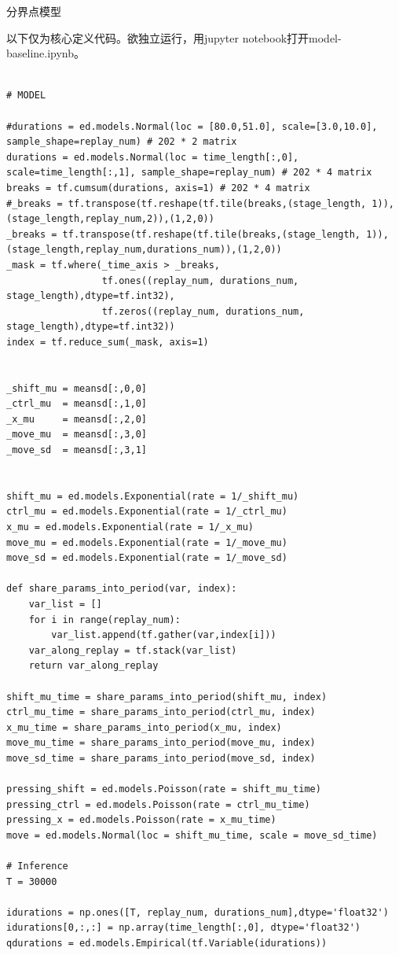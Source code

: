 \documentclass[UTF8]{ctexart}
\begin{document}
分界点模型

以下仅为核心定义代码。欲独立运行，用jupyter notebook打开model-baseline.ipynb。

\begin{verbatim}

# MODEL

#durations = ed.models.Normal(loc = [80.0,51.0], scale=[3.0,10.0], sample_shape=replay_num) # 202 * 2 matrix
durations = ed.models.Normal(loc = time_length[:,0], scale=time_length[:,1], sample_shape=replay_num) # 202 * 4 matrix
breaks = tf.cumsum(durations, axis=1) # 202 * 4 matrix
#_breaks = tf.transpose(tf.reshape(tf.tile(breaks,(stage_length, 1)),(stage_length,replay_num,2)),(1,2,0))  
_breaks = tf.transpose(tf.reshape(tf.tile(breaks,(stage_length, 1)),(stage_length,replay_num,durations_num)),(1,2,0))  
_mask = tf.where(_time_axis > _breaks, 
                 tf.ones((replay_num, durations_num, stage_length),dtype=tf.int32), 
                 tf.zeros((replay_num, durations_num, stage_length),dtype=tf.int32))
index = tf.reduce_sum(_mask, axis=1)


_shift_mu = meansd[:,0,0]
_ctrl_mu  = meansd[:,1,0]
_x_mu     = meansd[:,2,0]
_move_mu  = meansd[:,3,0]
_move_sd  = meansd[:,3,1]


shift_mu = ed.models.Exponential(rate = 1/_shift_mu)
ctrl_mu = ed.models.Exponential(rate = 1/_ctrl_mu)
x_mu = ed.models.Exponential(rate = 1/_x_mu)
move_mu = ed.models.Exponential(rate = 1/_move_mu) 
move_sd = ed.models.Exponential(rate = 1/_move_sd) 

def share_params_into_period(var, index):
    var_list = []
    for i in range(replay_num):
        var_list.append(tf.gather(var,index[i]))
    var_along_replay = tf.stack(var_list)
    return var_along_replay

shift_mu_time = share_params_into_period(shift_mu, index)
ctrl_mu_time = share_params_into_period(ctrl_mu, index)
x_mu_time = share_params_into_period(x_mu, index)
move_mu_time = share_params_into_period(move_mu, index)
move_sd_time = share_params_into_period(move_sd, index)

pressing_shift = ed.models.Poisson(rate = shift_mu_time)
pressing_ctrl = ed.models.Poisson(rate = ctrl_mu_time)
pressing_x = ed.models.Poisson(rate = x_mu_time)
move = ed.models.Normal(loc = shift_mu_time, scale = move_sd_time)

# Inference
T = 30000

idurations = np.ones([T, replay_num, durations_num],dtype='float32')
idurations[0,:,:] = np.array(time_length[:,0], dtype='float32')
qdurations = ed.models.Empirical(tf.Variable(idurations))


\end{verbatim}
\end{document}
